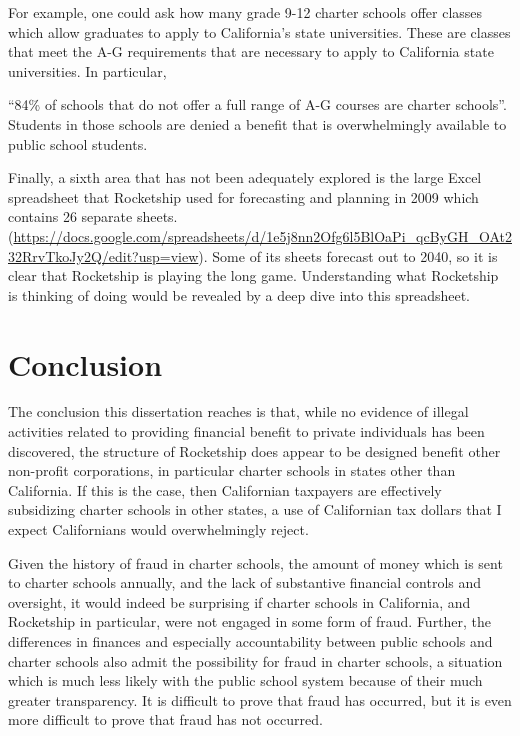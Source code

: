 For example, one could ask how many grade 9-12 charter schools offer classes which allow graduates to apply to California's state universities. These are classes that meet the A-G requirements that are necessary to apply to California state universities. In particular,
\begin{textquote} ``84\% of schools that do not offer a full range of A-G courses are charter schools''. Students in those schools are denied a benefit that is overwhelmingly available to public school students.  
\end{textquote}

Finally, a sixth area that has not been adequately explored is the large Excel spreadsheet that Rocketship used for forecasting and planning in 2009 which contains 26 separate sheets. (\url{https://docs.google.com/spreadsheets/d/1e5j8nn2Ofg6l5BlOaPi_qcByGH_OAt232RrvTkoJy2Q/edit?usp=view}). Some of its sheets forecast out to 2040, so it is clear that Rocketship is playing the long game. Understanding what Rocketship is thinking of doing would be revealed by a deep dive into this spreadsheet.

\section{Conclusion}%
\label{sec:conclusion}\indent%

The conclusion this dissertation reaches is that, while no evidence of illegal activities related to providing financial benefit to private individuals has been discovered, the structure of Rocketship does appear to be designed benefit other non-profit corporations, in particular charter schools in states other than California. If this is the case, then Californian taxpayers are effectively subsidizing charter schools in other states, a use of Californian tax dollars that I expect Californians would overwhelmingly reject.

Given the history of fraud in charter schools, the amount of money which is sent to charter schools annually, and the lack of substantive financial controls and oversight, it would indeed be surprising if charter schools in California, and Rocketship in particular, were not engaged in some form of fraud. Further, the differences in finances and especially accountability between public schools and charter schools also admit the possibility for fraud in charter schools, a situation which is much less likely with the public school system because of their much greater transparency. It is difficult to prove that fraud has occurred, but it is even more difficult to prove that fraud has not occurred. 

